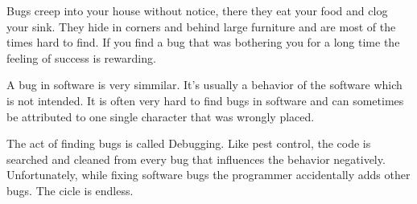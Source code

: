 
Bugs creep into your house without notice, there they eat your food
and clog your sink.  They hide in corners and behind large furniture
and are most of the times hard to find. If you find a bug that was
bothering you for a long time the feeling of success is rewarding.

A bug in software is very simmilar. It's usually a behavior of the
software which is not intended. It is often very hard to find bugs in
software and can sometimes be attributed to one single character that
was wrongly placed.

The act of finding bugs is called Debugging. Like pest control, the
code is searched and cleaned from every bug that influences the
behavior negatively.  Unfortunately, while fixing software bugs the
programmer accidentally adds other bugs. The cicle is endless.

